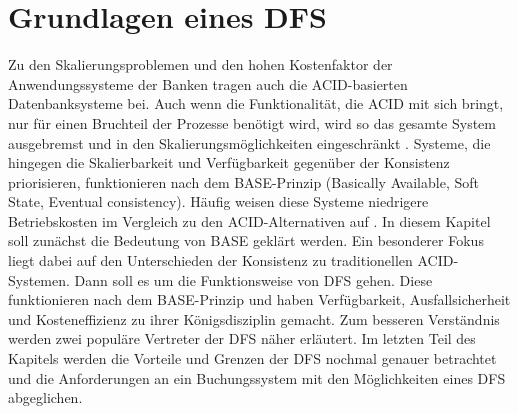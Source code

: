 \documentclass[12pt,oneside,a4paper,parskip]{scrbook}
\begin{document}
\chapter{Grundlagen eines DFS}
Zu den Skalierungsproblemen und den hohen Kostenfaktor der Anwendungssysteme der Banken tragen auch die ACID-basierten Datenbanksysteme bei. Auch wenn die Funktionalität, die ACID mit sich bringt, nur für einen Bruchteil der Prozesse benötigt wird, wird so das gesamte System ausgebremst und in den Skalierungsmöglichkeiten eingeschränkt \cite{salt}.
Systeme, die hingegen die Skalierbarkeit und Verfügbarkeit gegenüber der Konsistenz priorisieren, funktionieren nach dem BASE-Prinzip (Basically Available, Soft State, Eventual consistency). Häufig weisen diese Systeme niedrigere Betriebskosten im Vergleich zu den ACID-Alternativen auf \cite{clusterBASE}.
In diesem Kapitel soll zunächst die Bedeutung von BASE geklärt werden. Ein besonderer Fokus liegt dabei auf den Unterschieden der Konsistenz zu traditionellen ACID-Systemen. Dann soll es um die Funktionsweise von DFS gehen. Diese funktionieren nach dem BASE-Prinzip und haben Verfügbarkeit, Ausfallsicherheit und Kosteneffizienz zu ihrer Königsdisziplin gemacht. Zum besseren Verständnis werden zwei populäre Vertreter der DFS näher erläutert. Im letzten Teil des Kapitels werden die Vorteile und Grenzen der DFS nochmal genauer betrachtet und die Anforderungen an ein Buchungssystem mit den Möglichkeiten eines DFS abgeglichen.
\end{document}
